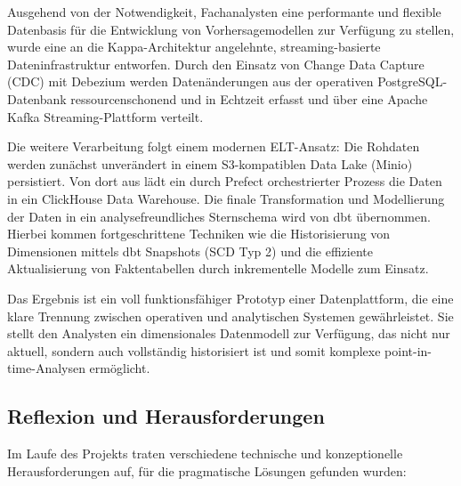\documentclass[
    12pt,               
    a4paper,        
    ngerman            
]{scrartcl}
\begin{document}
Ausgehend von der Notwendigkeit, Fachanalysten eine performante und flexible Datenbasis für die Entwicklung von Vorhersagemodellen zur Verfügung zu stellen, wurde eine an die Kappa-Architektur angelehnte, streaming-basierte Dateninfrastruktur entworfen. Durch den Einsatz von Change Data Capture (CDC) mit Debezium werden Datenänderungen aus der operativen PostgreSQL-Datenbank ressourcenschonend und in Echtzeit erfasst und über eine Apache Kafka Streaming-Plattform verteilt.

Die weitere Verarbeitung folgt einem modernen ELT-Ansatz: Die Rohdaten werden zunächst unverändert in einem S3-kompatiblen Data Lake (Minio) persistiert. Von dort aus lädt ein durch Prefect orchestrierter Prozess die Daten in ein ClickHouse Data Warehouse. Die finale Transformation und Modellierung der Daten in ein analysefreundliches Sternschema wird von dbt übernommen. Hierbei kommen fortgeschrittene Techniken wie die Historisierung von Dimensionen mittels dbt Snapshots (SCD Typ 2) und die effiziente Aktualisierung von Faktentabellen durch inkrementelle Modelle zum Einsatz.

Das Ergebnis ist ein voll funktionsfähiger Prototyp einer Datenplattform, die eine klare Trennung zwischen operativen und analytischen Systemen gewährleistet. Sie stellt den Analysten ein dimensionales Datenmodell zur Verfügung, das nicht nur aktuell, sondern auch vollständig historisiert ist und somit komplexe point-in-time-Analysen ermöglicht.

\subsection{Reflexion und Herausforderungen}
\label{sec:fazit_reflexion}

Im Laufe des Projekts traten verschiedene technische und konzeptionelle Herausforderungen auf, für die pragmatische Lösungen gefunden wurden:
\end{document}
